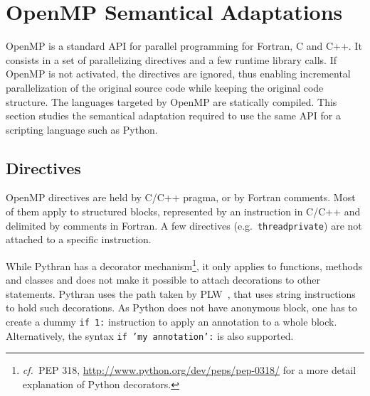 \documentclass{llncs}
\newcommand\see{\emph{cf.\ }}
\begin{document}
\section{OpenMP Semantical Adaptations}\label{sec:python-openmp}

OpenMP is a standard API for parallel programming for Fortran, C and C++. It
consists in a set of parallelizing directives and a few runtime library calls.
If OpenMP is not activated, the directives are ignored, thus enabling
incremental parallelization of the original source code while keeping the
original code structure. The languages targeted by OpenMP are statically
compiled. This section studies the semantical adaptation required to use the
same API for a scripting language such as Python.

\subsection{Directives}

OpenMP directives are held by C/C++ pragma, or by Fortran comments. Most of them
apply to structured blocks, represented by an instruction in C/C++ and delimited
by comments in Fortran. A few directives (e.g.\ \texttt{threadprivate}) are not
attached to a specific instruction.

While Pythran has a decorator mechanism\footnote{\see PEP 318,
\url{http://www.python.org/dev/peps/pep-0318/} for a more detail explanation of
Python decorators.}, it only applies to functions, methods and classes and does
not make it possible to attach decorations to other statements. Pythran uses
the path taken by PLW~\cite{dongara2007}, that uses string instructions to hold
such decorations. As Python does not have anonymous block,
one has to create a dummy \texttt{if 1:} instruction to apply an annotation to a
whole block. Alternatively, the syntax \texttt{if 'my annotation':} is also
supported. 

%
\end{document}
